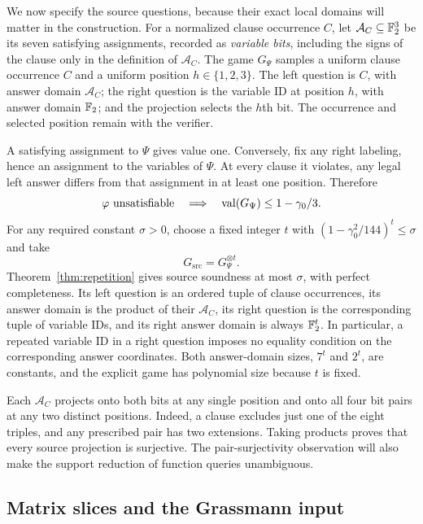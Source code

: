 We now specify the source questions, because their exact local domains
will matter in the construction.  For a normalized clause occurrence
$C$, let $\mathcal A_C\subseteq\mathbb F_2^3$ be its seven satisfying
assignments, recorded as \emph{variable bits}, including the signs of
the clause only in the definition of $\mathcal A_C$.  The game
$G_\Psi$ samples a uniform clause occurrence $C$ and a uniform
position $h\in\{1,2,3\}$.  The left question is $C$, with answer
domain $\mathcal A_C$; the right question is the variable ID at
position $h$, with answer domain $\mathbb F_2$; and the projection selects
the $h$th bit.  The occurrence and selected position remain with the
verifier.

A satisfying assignment to $\Psi$ gives value one.  Conversely,
fix any right labeling, hence an assignment to the variables of
$\Psi$.  At every clause it violates, any legal left answer differs
from that assignment in at least one position.  Therefore
\begin{equation}
 \varphi\text{ unsatisfiable}
 \quad\Longrightarrow\quad
 \operatorname{val}(G_\Psi)\leq1-\gamma_0/3.
 \label{eq:prelim-clause-gap}
\end{equation}
For any required constant $\sigma>0$, choose a fixed integer $t$ with
$(1-\gamma_0^2/144)^t\leq\sigma$ and take
\begin{equation}
 G_{\mathrm{src}}=G_\Psi^{\otimes t}.
 \label{eq:prelim-source-game}
\end{equation}
Theorem~\ref{thm:repetition} gives source soundness at most $\sigma$,
with perfect completeness.  Its left question is an ordered tuple of
clause occurrences, its answer domain is the product of their
$\mathcal A_C$, its right question is the corresponding tuple of
variable IDs, and its right answer domain is always $\mathbb F_2^t$.
In particular, a repeated variable ID in a right question imposes no
equality condition on the corresponding answer coordinates.
Both answer-domain sizes, $7^t$ and $2^t$, are constants, and the
explicit game has polynomial size because $t$ is fixed.

Each $\mathcal A_C$ projects onto both bits at any single position and
onto all four bit pairs at any two distinct positions.  Indeed, a
clause excludes just one of the eight triples, and any prescribed pair
has two extensions.  Taking products proves that every source
projection is surjective.  The pair-surjectivity observation will also
make the support reduction of function queries unambiguous.

\subsection{Matrix slices and the Grassmann input}

